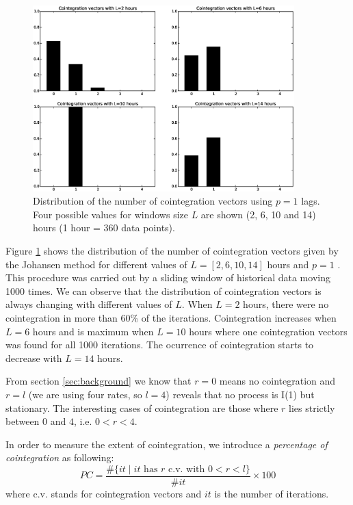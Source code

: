 \begin{figure}[!h]
  \centering
   \includegraphics[width=0.9\textwidth]{img/Fig1}
  \caption{Distribution of the number of cointegration vectors using $p=1$ lags.
  Four possible values for windows size $L$ are shown (2, 6, 10 and 14) hours (1
  hour = 360 data points).}
  \label{fig:hists}
\end{figure}

Figure \ref{fig:hists} shows the distribution of the number of cointegration
vectors given by the Johansen method for different values of $L=[2,6,10,14]$
hours and $p=1$ . This procedure was carried out by a sliding window of
historical data moving 1000 times. We can observe that the distribution of
cointegration vectors is always changing with different values of $L$. When
$L=2$ hours, there were no cointegration in more than 60\% of the iterations.
Cointegration increases when $L=6$ hours and is maximum when $L=10$ hours where
one cointegration vectors was found for all 1000 iterations. The ocurrence of
cointegration starts to decrease with $L=14$ hours.

From section \ref{sec:background} we know that $r=0$ means no cointegration and
$r=l$ (we are using four rates, so $l=4$) reveals that no process is I(1) but
stationary.  The interesting cases of cointegration are those where $r$ lies
strictly between $0$ and $4$, i.e. $0<r<4$.

In order to measure the extent of cointegration, we introduce a
{\em percentage of cointegration\/} as following:
\begin{equation} \label{eq:pcoint}
PC = 
\frac{\#\{ it \mid \text{$it$ has $r$ c.v. with $0<r<l$}\}}
     {\#it}\times 100
\end{equation}
where c.v. stands for cointegration vectors and $it$ is the number of iterations.

